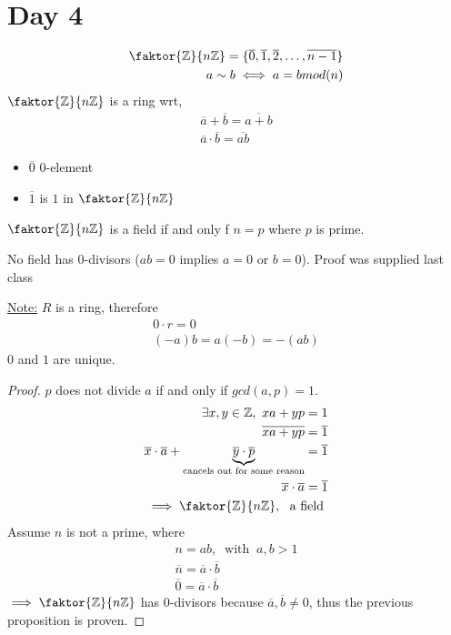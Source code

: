 \documentclass[../notes.tex]{subfiles}
\begin{document}
\section{Day 4}
\begin{align*}
    \faktor{\Z}{n\Z}=\{\overline{0},\overline{1},\overline{2},\dots,\overline{n-1}\}\\
    a\sim b \iff a=bmod(n)\\
\end{align*}
$\faktor{\Z}{n\Z}$ is a ring wrt,
\begin{align*}
    \overline{a}+\overline{b}=\overline{a+b}\\
    \overline{a}\cdot\overline{b}=\overline{ab}
\end{align*}
\begin{itemize}
    \item $\overline{0} $ $0$-element
    \item $\overline{1}$ is $1$ in $\faktor{\Z}{n\Z}$
\end{itemize}
\begin{theorem}
    $\faktor{\Z}{n\Z}$ is a field if and only f $n=p$ where $p$ is prime.
\end{theorem}
\begin{proposition}
    No field has $0$-divisors ($ab=0$ implies $a=0$ or $b=0$). Proof was
    supplied last class
\end{proposition}
\underline{Note:}
$R$ is a ring, therefore
\begin{align*}
    0\cdot r=0\\
    (-a)b=a(-b)=-(ab)
\end{align*}
$0$ and $1$ are unique.
\begin{proof}
$p$ does not divide $a$ if and only if $gcd(a,p)=1$.
\begin{align*}
    \exists x,y \in \Z,\ xa+yp=1\\
    \overline{xa+yp}=\overline{1}\\
    \overline{x}\cdot\overline{a}+\underbrace{\overline{y}\cdot\overline{p}}_{\text{cancels out for some reason}}=\overline{1}\\
    \overline{x}\cdot\overline{a}=\overline{1}\\
    \implies \faktor{\Z}{n\Z},\ \text{ a field }\\
\end{align*}
Assume $n$ is not a prime, where
\begin{align*}
    n=ab,\ \text{ with }\ a,b>1\\
    \overline{n}=\overline{a}\cdot\overline{b}\\
    \overline{0}=\overline{a}\cdot\overline{b}
\end{align*}
$\implies\faktor{\Z}{n\Z}$ has $0$-divisors because $\overline{a},
\overline{b}\neq 0$, thus the previous proposition is proven.
\end{proof}
\end{document}
